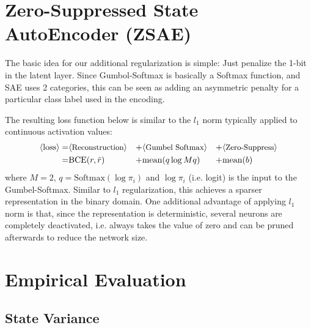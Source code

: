 \section{Zero-Suppressed State AutoEncoder (ZSAE)}
\label{zsae}

The basic idea for our additional regularization is simple: Just penalize the
1-bit in the latent layer. Since Gumbol-Softmax is basically a Softmax function,
and SAE uses 2 categories, this can be seen as adding an
asymmetric penalty for a particular class label used in the encoding.

The resulting loss function below is similar to the $l_1$ norm typically
applied to continuous activation values:
\begin{align*}
 \brackets{\text{loss}} = & \brackets{\text{\small Reconstruction}} &+ & \brackets{\text{\small Gumbel Softmax}} &+ & \brackets{\text{\small Zero-Suppress}} \\ 
 =                        & \text{BCE}(r,\tilde{r})     &+ & \text{mean}(q \log Mq)           &+ & \text{mean}(b)                  
\end{align*}
where $M=2$, $q=\text{Softmax}(\log \pi_i)$ and $\log \pi_i$ (i.e. logit) is the input to the Gumbel-Softmax.
Similar to $l_1$ regularization, this achieves a sparser representation in the binary domain.
One additional advantage of applying $l_1$ norm is that, since the representation is deterministic,
several neurons are completely deactivated, i.e. always takes the value of zero
and can be pruned afterwards to reduce the network size.

\section{Empirical Evaluation}
\label{evaluation}

\subsection{State Variance}

